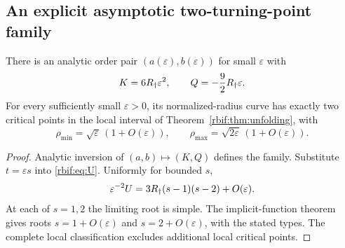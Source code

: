 \subsection{An explicit asymptotic two-turning-point family}
\begin{corollary}
\label{rbif:cor:twofamily}
There is an analytic order pair $(a(\varepsilon),b(\varepsilon))$ for
small $\varepsilon$ with
\begin{equation}
 K=6R_\dagger\varepsilon^2,\qquad
 Q=-\frac92R_\dagger\varepsilon.
 \label{rbif:eq:epsfamily}
\end{equation}
For every sufficiently small $\varepsilon>0$, its normalized-radius
curve has exactly two critical points in the local interval of
Theorem~\ref{rbif:thm:unfolding}, with
\begin{equation}
 \rho_{\min}=\sqrt\varepsilon\,(1+O(\varepsilon)),\qquad
 \rho_{\max}=\sqrt{2\varepsilon}\,(1+O(\varepsilon)).
 \label{rbif:eq:epsroots}
\end{equation}
\end{corollary}
\begin{proof}
Analytic inversion of $(a,b)\mapsto(K,Q)$ defines the family.
Substitute $t=\varepsilon s$ into \eqref{rbif:eq:U}. Uniformly for
bounded $s$,
\[
 \varepsilon^{-2}U
 =3R_\dagger(s-1)(s-2)+O(\varepsilon).
\]
At each of $s=1,2$ the limiting root is simple. The implicit-function
theorem gives roots $s=1+O(\varepsilon)$ and
$s=2+O(\varepsilon)$, with the stated types. The complete local
classification excludes additional local critical points.
\end{proof}

